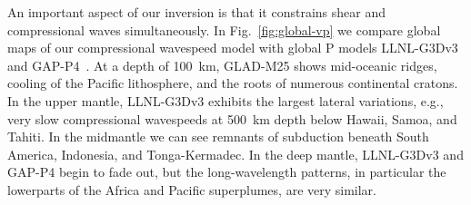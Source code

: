 \documentclass[extra,mreferee]{gji}
\begin{document}

An important aspect of our inversion is that it constrains shear and
compressional waves simultaneously. In Fig.~\ref{fig:global-vp} we
compare global maps of our compressional wavespeed model with global P models
LLNL-G3Dv3~\citep{simmons2012llnl} and GAP-P4~\citep{fukao2013subducted}.
At a depth of 100~km,
GLAD-M25 shows mid-oceanic ridges, cooling of the Pacific lithosphere,
and the roots of numerous continental cratons. In the upper mantle, LLNL-G3Dv3
exhibits the largest lateral variations,
e.g., very slow compressional wavespeeds at 500~km depth below Hawaii, Samoa, and Tahiti.
In the midmantle we can see remnants of subduction beneath South America, Indonesia,
and Tonga-Kermadec.
In the deep mantle, LLNL-G3Dv3 and GAP-P4 begin to fade out, but the long-wavelength patterns,
in particular the lowerparts of the Africa and Pacific superplumes, are very similar.
\end{document}
